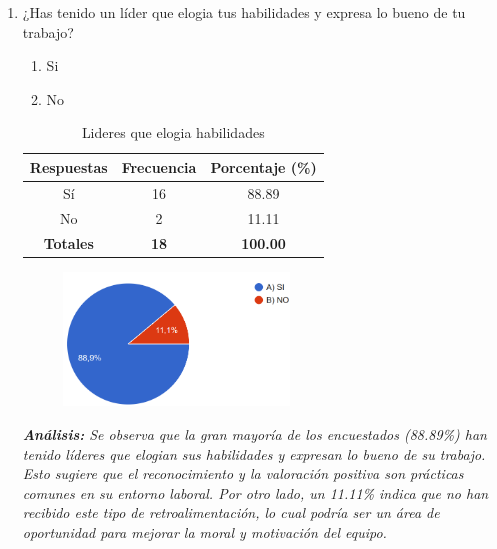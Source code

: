 \documentclass[journal]{IEEEtran}
\begin{document}
\begin{enumerate}
	\item ¿Has tenido un líder que elogia tus habilidades y expresa lo bueno de tu trabajo?
	\begin{enumerate}
		\item Si
		\item No
	\end{enumerate}
	\begin{table}[H]
		\renewcommand{\arraystretch}{1.3}
		\centering
		\caption{Lideres que elogia habilidades}
		\begin{tabular}{c c c}
			\hline
			\textbf{Respuestas} & \textbf{Frecuencia} & \textbf{Porcentaje (\%)}\\
			\hline
			Sí & 16 & 88.89\\
			No & 2 & 11.11\\
			\hline
			\textbf{Totales} &\textbf{18}& \textbf{100.00}\\
			\hline
		\end{tabular}
	\end{table}
	\begin{figure}[h]
		\centering
		\includegraphics[width=06cm]{Pregunta18}
	\end{figure}
	\textit{\textbf{Análisis:} Se observa que la gran mayoría de los encuestados (88.89\%) han tenido líderes que elogian sus habilidades y expresan lo bueno de su trabajo. Esto sugiere que el reconocimiento y la valoración positiva son prácticas comunes en su entorno laboral. Por otro lado, un 11.11\% indica que no han recibido este tipo de retroalimentación, lo cual podría ser un área de oportunidad para mejorar la moral y motivación del equipo.}\\
	

\end{enumerate}
\end{document}
